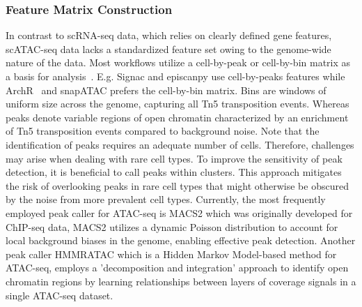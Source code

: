 \subsubsection{Feature Matrix Construction} 
In contrast to scRNA-seq data, which relies on clearly defined gene features, scATAC-seq data lacks a standardized feature set owing to the genome-wide nature of the data. Most workflows utilize a cell-by-peak or cell-by-bin matrix as a basis for analysis~\citep{heumos2023best}. E.g. Signac\citep{signac} and episcanpy\citep{Danese2021episcanpy} use cell-by-peaks features while ArchR~\citep{Granja2021} and snapATAC\citep{fang2021snapatac} prefers the cell-by-bin matrix. Bins are windows of uniform size across the genome, capturing all Tn5 transposition events. Whereas peaks denote variable regions of open chromatin characterized by an enrichment of Tn5 transposition events compared to background noise. Note that the identification of peaks requires an adequate number of cells. Therefore, challenges may arise when dealing with rare cell types. To improve the sensitivity of peak detection, it is beneficial to call peaks within clusters. This approach mitigates the risk of overlooking peaks in rare cell types that might otherwise be obscured by the noise from more prevalent cell types. Currently, the most frequently employed peak caller for ATAC-seq is MACS2 \citep{zhang2008macs2} which was originally developed for ChIP-seq data, MACS2 utilizes a dynamic Poisson distribution to account for local background biases in the genome, enabling effective peak detection. Another peak caller HMMRATAC \citep{tarbell2019hmmratac} which is a Hidden Markov Model-based method for ATAC-seq, employs a 'decomposition and integration' approach to identify open chromatin regions by learning relationships between layers of coverage signals in a single ATAC-seq dataset.  

